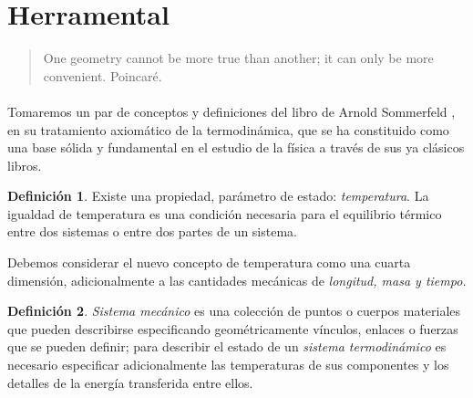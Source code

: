 \documentclass{article}
\theoremstyle{definition} \newtheorem{defi}{Definici\'on}
\theoremstyle{definition} \newtheorem{teo}{Teorema}
\theoremstyle{definition} \newtheorem{cor}{Corolario}
\begin{document}
\section{Herramental}
\begin{quote}
One geometry cannot be more true than another; it can only be more convenient. Poincar\'e.
\end{quote}
\paragraph{}
Tomaremos un par de conceptos y definiciones del libro de Arnold Sommerfeld \cite{AS}, en su tratamiento axiom\'atico de la termodin\'amica, que se ha constituido como una base s\'olida y fundamental en el estudio de la f\'isica a trav\'es de sus ya cl\'asicos libros.
\begin{defi}
Existe una propiedad, par\'ametro de estado: \emph{temperatura}. La igualdad de temperatura es una condici\'on necesaria para el equilibrio t\'ermico entre dos sistemas o entre dos partes de un sistema.
\end{defi}
Debemos considerar el nuevo concepto de temperatura como una cuarta dimensi\'on, adicionalmente a las cantidades mec\'anicas de \emph{longitud, masa y tiempo.}
\begin{defi}
\emph{Sistema mec\'anico} es una colecci\'on de puntos o cuerpos materiales que pueden describirse especificando geom\'etricamente v\'inculos, enlaces o fuerzas que se pueden definir; para describir el estado de un \emph{sistema termodin\'amico} es necesario especificar adicionalmente las temperaturas de sus componentes y los detalles de la energ\'ia transferida entre ellos.
\end{defi}
\end{document}
